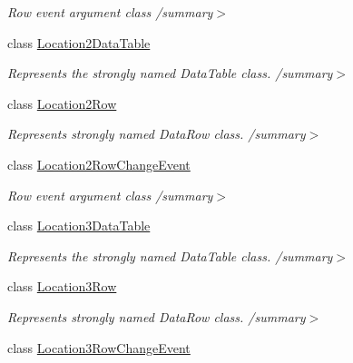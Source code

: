 \begin{DoxyCompactItemize}
\begin{DoxyCompactList}\small\item\em Row event argument class /summary$>$ \end{DoxyCompactList}\item 
class \hyperlink{class_env_int_1_1_win32_1_1_field_tech_1_1_manager_1_1_data_sets_1_1_guide_ware_mobile_data_set_1_1_location2_data_table}{Location2\+Data\+Table}
\begin{DoxyCompactList}\small\item\em Represents the strongly named Data\+Table class. /summary$>$ \end{DoxyCompactList}\item 
class \hyperlink{class_env_int_1_1_win32_1_1_field_tech_1_1_manager_1_1_data_sets_1_1_guide_ware_mobile_data_set_1_1_location2_row}{Location2\+Row}
\begin{DoxyCompactList}\small\item\em Represents strongly named Data\+Row class. /summary$>$ \end{DoxyCompactList}\item 
class \hyperlink{class_env_int_1_1_win32_1_1_field_tech_1_1_manager_1_1_data_sets_1_1_guide_ware_mobile_data_set_1_1_location2_row_change_event}{Location2\+Row\+Change\+Event}
\begin{DoxyCompactList}\small\item\em Row event argument class /summary$>$ \end{DoxyCompactList}\item 
class \hyperlink{class_env_int_1_1_win32_1_1_field_tech_1_1_manager_1_1_data_sets_1_1_guide_ware_mobile_data_set_1_1_location3_data_table}{Location3\+Data\+Table}
\begin{DoxyCompactList}\small\item\em Represents the strongly named Data\+Table class. /summary$>$ \end{DoxyCompactList}\item 
class \hyperlink{class_env_int_1_1_win32_1_1_field_tech_1_1_manager_1_1_data_sets_1_1_guide_ware_mobile_data_set_1_1_location3_row}{Location3\+Row}
\begin{DoxyCompactList}\small\item\em Represents strongly named Data\+Row class. /summary$>$ \end{DoxyCompactList}\item 
class \hyperlink{class_env_int_1_1_win32_1_1_field_tech_1_1_manager_1_1_data_sets_1_1_guide_ware_mobile_data_set_1_1_location3_row_change_event}{Location3\+Row\+Change\+Event}

\end{DoxyCompactItemize}
